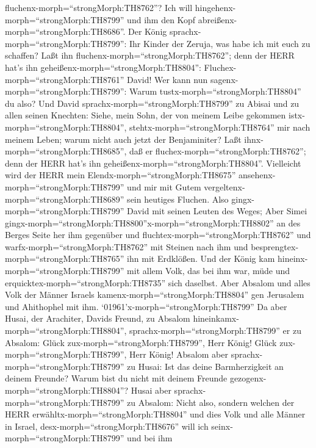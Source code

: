 fluchenx-morph=``strongMorph:TH8762''? Ich will
hingehenx-morph=``strongMorph:TH8799'' und ihm den Kopf
abreißenx-morph=``strongMorph:TH8686''.  Der König
sprachx-morph=``strongMorph:TH8799'': Ihr Kinder der Zeruja, was habe
ich mit euch zu schaffen? Laßt ihn
fluchenx-morph=``strongMorph:TH8762''; denn der HERR hat's ihn
geheißenx-morph=``strongMorph:TH8804'':
Fluchex-morph=``strongMorph:TH8761'' David! Wer kann nun
sagenx-morph=``strongMorph:TH8799'': Warum
tustx-morph=``strongMorph:TH8804'' du also?  Und David
sprachx-morph=``strongMorph:TH8799'' zu Abisai und zu allen seinen
Knechten: Siehe, mein Sohn, der von meinem Leibe gekommen
istx-morph=``strongMorph:TH8804'', stehtx-morph=``strongMorph:TH8764''
mir nach meinem Leben; warum nicht auch jetzt der Benjaminiter? Laßt
ihnx-morph=``strongMorph:TH8685'', daß er
fluchex-morph=``strongMorph:TH8762''; denn der HERR hat's ihn
geheißenx-morph=``strongMorph:TH8804''.  Vielleicht wird
der HERR mein Elendx-morph=``strongMorph:TH8675''
ansehenx-morph=``strongMorph:TH8799'' und mir mit Gutem
vergeltenx-morph=``strongMorph:TH8689'' sein heutiges Fluchen.
 Also gingx-morph=``strongMorph:TH8799'' David mit seinen
Leuten des Weges; Aber Simei
gingx-morph=``strongMorph:TH8800''x-morph=``strongMorph:TH8802'' an des
Berges Seite her ihm gegenüber und fluchtex-morph=``strongMorph:TH8762''
und warfx-morph=``strongMorph:TH8762'' mit Steinen nach ihm und
besprengtex-morph=``strongMorph:TH8765'' ihn mit Erdklößen.
 Und der König kam hineinx-morph=``strongMorph:TH8799'' mit
allem Volk, das bei ihm war, müde und
erquicktex-morph=``strongMorph:TH8735'' sich daselbst. 
Aber Absalom und alles Volk der Männer Israels
kamenx-morph=``strongMorph:TH8804'' gen Jerusalem und Ahithophel mit
ihm.  `01961'\textbar x-morph=``strongMorph:TH8799'' Da
aber Husai, der Arachiter, Davids Freund, zu Absalom
hineinkamx-morph=``strongMorph:TH8804'',
sprachx-morph=``strongMorph:TH8799'' er zu Absalom: Glück
zux-morph=``strongMorph:TH8799'', Herr König! Glück
zux-morph=``strongMorph:TH8799'', Herr König!  Absalom aber
sprachx-morph=``strongMorph:TH8799'' zu Husai: Ist das deine
Barmherzigkeit an deinem Freunde? Warum bist du nicht mit deinem Freunde
gezogenx-morph=``strongMorph:TH8804''?  Husai aber
sprachx-morph=``strongMorph:TH8799'' zu Absalom: Nicht also, sondern
welchen der HERR erwähltx-morph=``strongMorph:TH8804'' und dies Volk und
alle Männer in Israel, desx-morph=``strongMorph:TH8676'' will ich
seinx-morph=``strongMorph:TH8799'' und bei ihm

